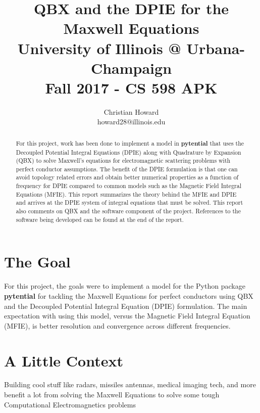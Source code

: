 \documentclass{article}[12pt]
\title{QBX and the DPIE for the Maxwell Equations \\  University of Illinois @ Urbana-Champaign\\ Fall 2017 - CS 598 APK}
\author{
	Christian Howard \\ howard28@illinois.edu
}
\date{} %
\begin{document}
	
	\maketitle
	\begin{abstract}
		For this project, work has been done to implement a model in \textbf{pytential} that uses the Decoupled Potential Integral Equations (DPIE) along with Quadrature by Expansion (QBX) to solve Maxwell's equations for electromagnetic scattering problems with perfect conductor assumptions. The benefit of the DPIE formulation is that one can avoid topology related errors and obtain better numerical properties as a function of frequency for DPIE compared to common models such as the Magnetic Field Integral Equations (MFIE). This report summarizes the theory behind the MFIE and DPIE and arrives at the DPIE system of integral equations that must be solved. This report also comments on QBX and the software component of the project. References to the software being developed can be found at the end of the report.
	\end{abstract}
	
	\newpage
	\tableofcontents
	
	\newpage
	
	\section{The Goal}
	For this project, the goals were to implement a model for the Python package \textbf{pytential} for tackling the Maxwell Equations for perfect conductors using QBX and the Decoupled Potential Integral Equation (DPIE) formulation. The main expectation with using this model, versus the Magnetic Field Integral Equation (MFIE), is better resolution and convergence across different frequencies.
	
	

	
	
	\section{A Little Context}
	Building cool stuff like radars, missiles antennas, medical imaging tech, and more benefit a lot from solving the Maxwell Equations to solve some tough Computational Electromagnetics problems
	
\end{document}
